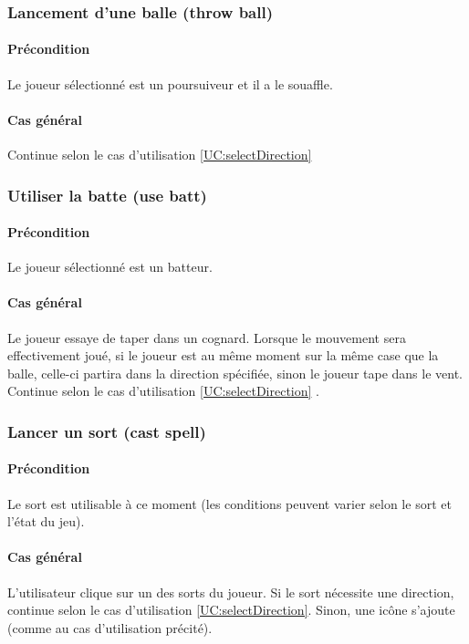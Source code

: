 \subsubsection{Lancement d'une balle (throw ball)}
    \paragraph{Précondition} Le joueur sélectionné est un \gls{poursuiveur} et il a le \gls{souaffle}.
    \paragraph{Cas général} Continue selon le cas d'utilisation \ref{UC:selectDirection}

\subsubsection{Utiliser la batte (use batt)}
    \paragraph{Précondition} Le joueur sélectionné est un \gls{batteur}.
    \paragraph{Cas général} Le joueur essaye de taper dans un \gls{cognard}. Lorsque le mouvement sera effectivement joué, si le joueur est au même moment sur la même case que la balle, celle-ci partira dans la direction spécifiée, sinon le joueur tape dans le vent. Continue selon le cas d'utilisation \ref{UC:selectDirection} .

\subsubsection{Lancer un sort (cast spell)}
    \label{UC:castSpell}
    \paragraph{Précondition} Le sort est utilisable à ce moment (les conditions peuvent varier selon le sort et l'état du jeu).
    \paragraph{Cas général} L'utilisateur clique sur un des sorts du joueur. Si le sort nécessite une direction, continue selon le cas d'utilisation \ref{UC:selectDirection}. Sinon, une icône s'ajoute (comme au cas d'utilisation précité).
